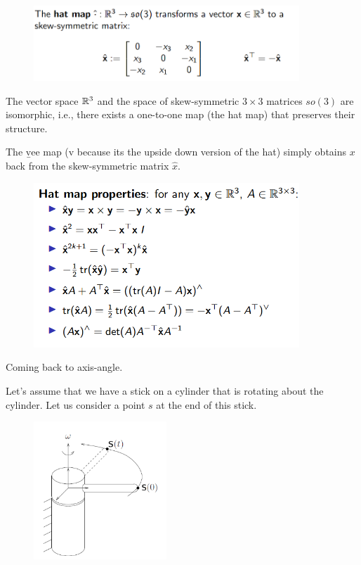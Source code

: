 \begin{figure}[h]\centering\includegraphics[width=10cm]{img/j_3_11.png}\end{figure}

The vector space $\mathbb{R}^3$ and the space of skew-symmetric $3\times3 $ matrices $so(3)$ are isomorphic, i.e., there exists a one-to-one map (the hat map) that preserves their structure.

The \b{vee map} (v because its the upside down version of the hat) simply obtains $x$ back from the skew-symmetric matrix $\hat{x}$.

\begin{figure}[h]\centering\includegraphics[width=10cm]{img/j_3_12.png}\end{figure}

Coming back to axis-angle. 

Let's assume that we have a stick on a cylinder that is rotating about the cylinder. Let us consider a point $s$ at the end of this stick.

\begin{figure}[h]\centering\includegraphics[width=5cm]{img/j_3_13.png}\end{figure}

